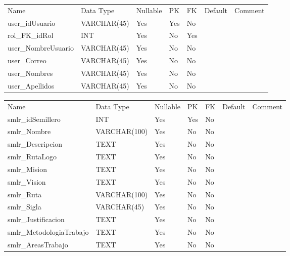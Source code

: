 
			\begin{center}
				\begin{tabular}{ |l|l|l|l|l|l|l| }
					\hline
					Name & Data Type & Nullable & PK & FK & Default & Comment \\
					user_idUsuario & VARCHAR(45) & Yes & Yes & No &  & \\ \hline 
rol_FK_idRol & INT & Yes & No & Yes &  & \\ \hline 
user_NombreUsuario & VARCHAR(45) & Yes & No & No &  & \\ \hline 
user_Correo & VARCHAR(45) & Yes & No & No &  & \\ \hline 
user_Nombres & VARCHAR(45) & Yes & No & No &  & \\ \hline 
user_Apellidos & VARCHAR(45) & Yes & No & No &  & \\ \hline 

				\end{tabular}
			\end{center}
		

			\begin{center}
				\begin{tabular}{ |l|l|l|l|l|l|l| }
					\hline
					Name & Data Type & Nullable & PK & FK & Default & Comment \\
					smlr_idSemillero & INT & Yes & Yes & No &  & \\ \hline 
smlr_Nombre & VARCHAR(100) & Yes & No & No &  & \\ \hline 
smlr_Descripcion & TEXT & Yes & No & No &  & \\ \hline 
smlr_RutaLogo & TEXT & Yes & No & No &  & \\ \hline 
smlr_Mision & TEXT & Yes & No & No &  & \\ \hline 
smlr_Vision & TEXT & Yes & No & No &  & \\ \hline 
smlr_Ruta & VARCHAR(100) & Yes & No & No &  & \\ \hline 
smlr_Sigla & VARCHAR(45) & Yes & No & No &  & \\ \hline 
smlr_Justificacion & TEXT & Yes & No & No &  & \\ \hline 
smlr_MetodologiaTrabajo & TEXT & Yes & No & No &  & \\ \hline 
smlr_AreasTrabajo & TEXT & Yes & No & No &  & \\ \hline 

				\end{tabular}
			\end{center}
		

